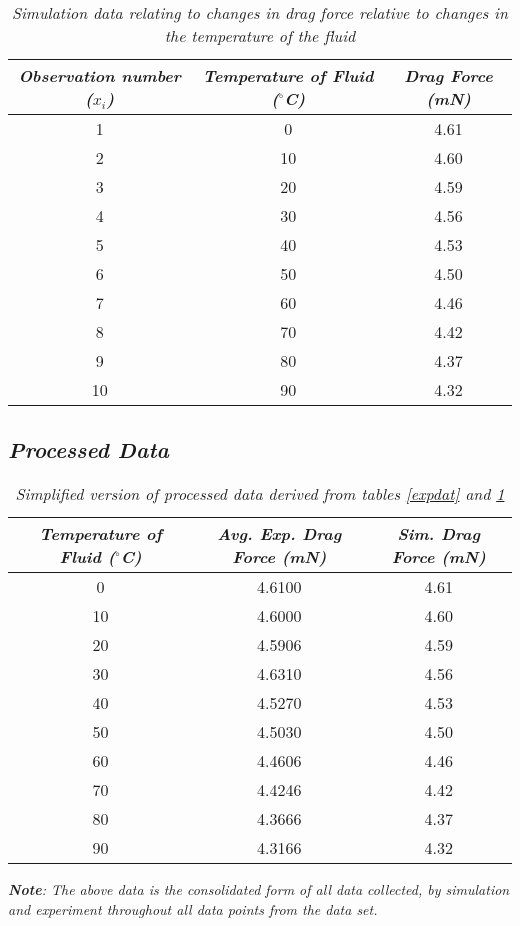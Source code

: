 	\begin{table}[H]
		\centering
		\begin{tabular}{|c|c|c|}
			\hline
			\hline
			\textit{Observation number ($x_i$)} & \textit{Temperature of Fluid ($^\circ$C)} & \textit{Drag Force (mN)} \\
			\hline
			\hline
			1 & 0 & 4.61 \\
			\hline
			2 & 10 & 4.60 \\
			\hline
			3 & 20 & 4.59 \\
			\hline
			4 & 30 & 4.56 \\
			\hline
			5 & 40 & 4.53 \\
			\hline
			6 & 50 & 4.50 \\
			\hline
			7 & 60 & 4.46 \\
			\hline
			8 & 70 & 4.42 \\
			\hline
			9 & 80 & 4.37 \\
			\hline
			10 & 90 & 4.32 \\
			\hline
			\hline
		\end{tabular}
		\caption{\textit{Simulation data relating to changes in drag force relative to changes in the temperature of the fluid}}
		\label{simdat}
	\end{table}

\subsection{\textit{Processed Data}}

	\begin{table}[H]
		\centering
		\begin{tabular}{|c|c|c|}
			\hline
			\hline
			\textit{Temperature of Fluid ($^\circ$C)} & \textit{Avg. Exp. Drag Force (mN)} & \textit{Sim. Drag Force (mN)}\\
			\hline
			\hline
			0 & 4.6100 & 4.61 \\
			\hline
			10 & 4.6000 & 4.60 \\
			\hline
			20 & 4.5906 & 4.59 \\
			\hline
			30 & 4.6310 & 4.56 \\
			\hline
			40 & 4.5270 & 4.53 \\
			\hline
			50 & 4.5030 & 4.50 \\
			\hline
			60 & 4.4606 & 4.46 \\
			\hline
			70 & 4.4246 & 4.42 \\
			\hline
			80 & 4.3666 & 4.37 \\
			\hline
			90 & 4.3166 & 4.32 \\
			\hline
			\hline
		\end{tabular}
		\caption{\textit{Simplified version of processed data derived from tables \ref{expdat} and \ref{simdat}}}
		
	\end{table}

	\textit{\textbf{Note}: The above data is the consolidated form of all data collected, by simulation and experiment throughout all data points from the data set.}

